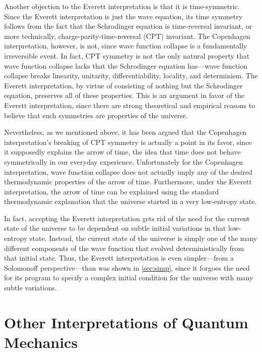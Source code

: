 \documentclass[
    12pt,
    letterpaper,
    aps,
    prd,
    longbibliography,
    twocolumn,
    nofootinbib,
    raggedbottom,
    amsmath,
    amssymb,
    amsfonts,
]{revtex4-1}
\begin{document}
Another objection to the Everett interpretation is that it is time-symmetric. Since the Everett interpretation is just the wave equation, its time symmetry follows from the fact that the Schrodinger equation is time-reversal invariant, or more technically, charge-parity-time-reversal (CPT) invariant. The Copenhagen interpretation, however, is not, since wave function collapse is a fundamentally irreversible event.\cite{time} In fact, CPT symmetry is not the only natural property that wave function collapse lacks that the Schrodinger equation has---wave function collapse breaks linearity, unitarity, differentiability, locality, and determinism.\cite{wallacebook}\cite{manyworldsbook}\cite{faq}\cite{lesswrongcollapse} The Everett interpretation, by virtue of consisting of nothing but the Schrodinger equation, preserves all of these properties. This is an argument in favor of the Everett interpretation, since there are strong theoretical and empirical reasons to believe that such symmetries are properties of the universe.\cite{quantumviolation}\cite{cptsym}\cite{linearity}\cite{townsend}

Nevertheless, as we mentioned above, it has been argued that the Copenhagen interpretation's breaking of CPT symmetry is actually a point in its favor, since it supposedly explains the arrow of time, the idea that time does not behave symmetrically in our everyday experience.\cite{time} Unfortunately for the Copenhagen interpretation, wave function collapse does not actually imply any of the desired thermodynamic properties of the arrow of time.\cite{time} Furthermore, under the Everett interpretation, the arrow of time can be explained using the standard thermodynamic explanation that the universe started in a very low-entropy state.\cite{arrowoftime}

In fact, accepting the Everett interpretation gets rid of the need for the current state of the universe to be dependent on subtle initial variations in that low-entropy state.\cite{arrowoftime} Instead, the current state of the universe is simply one of the many different components of the wave function that evolved deterministically from that initial state. Thus, the Everett interpretation is even simpler---from a Solomonoff perspective---than was shown in \autoref{sec:simp}, since it forgoes the need for its program to specify a complex initial condition for the universe with many subtle variations.

\section{Other Interpretations of Quantum Mechanics}
\label{sec:alts}
\end{document}
